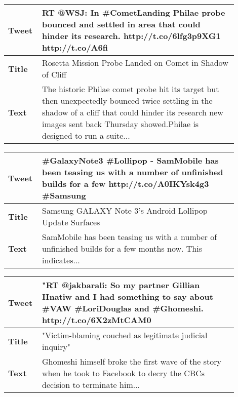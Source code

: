 \begin{table}[!t]
\centering
\begin{tabular}{|p{0.1\linewidth}|p{0.8\linewidth}|}
\hline
\textbf{Tweet} &   RT @WSJ: In \#CometLanding Philae probe bounced and settled in area that could hinder its research. http://t.co/6lfg3p9XG1 http://t.co/A6fi  \\ \hline
\textbf{Title} &   Rosetta Mission Probe Landed on Comet in Shadow of Cliff	                                                                                 \\ \hline
\textbf{Text}  &  The historic Philae comet probe hit its target but then unexpectedly bounced twice settling in the shadow of a cliff that could hinder its research new images sent back Thursday showed.Philae is designed to run a suite...                                                                                         \\ \hline
\end{tabular}
\label{tab:exq1no}
\end{table}


\begin{table}[!t]
\centering
\begin{tabular}{|p{0.1\linewidth}|p{0.8\linewidth}|}
\hline
\textbf{Tweet} & \#GalaxyNote3 \#Lollipop - SamMobile has been teasing us with a number of unfinished builds for a few http://t.co/A0IKYsk4g3 \#Samsung \\ \hline
\textbf{Title} &   Samsung GALAXY Note 3's Android Lollipop Update Surfaces                                                                                 \\ \hline
\textbf{Text}  &  SamMobile has been teasing us with a number of unfinished builds for a few months now. This indicates...                                                                                         \\ \hline
\end{tabular}
\label{tab:exq1yes}
\end{table}


\begin{table}[!t]
\centering
\begin{tabular}{|p{0.1\linewidth}|p{0.8\linewidth}|}
\hline
\textbf{Tweet} & "RT @jakbarali: So my partner Gillian Hnatiw and I had something to say about \#VAW \#LoriDouglas and \#Ghomeshi. http://t.co/6X2zMtCAM0 \\ \hline
\textbf{Title} & "Victim-blaming couched as legitimate judicial inquiry" \\ \hline
\textbf{Text}  & Ghomeshi himself broke the first wave of the story when he took to Facebook to decry the CBCs decision to terminate him... \\ \hline
\end{tabular}
\label{tab:exq2no}
\end{table}

